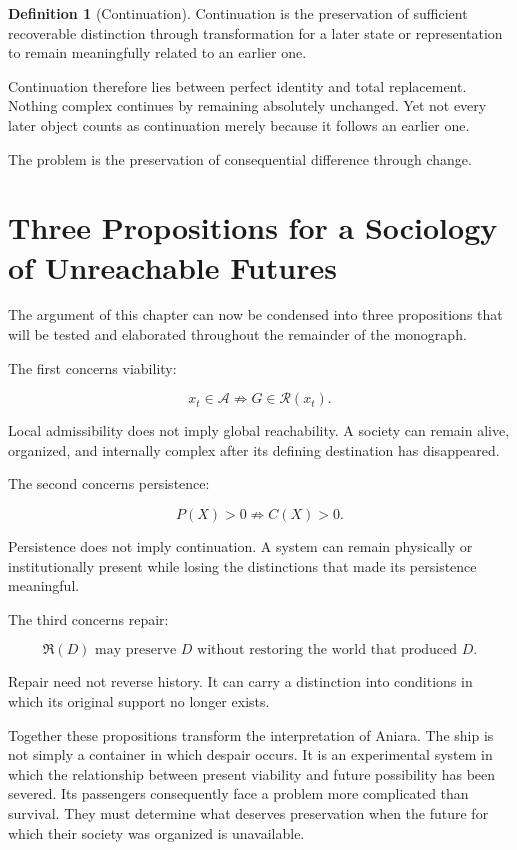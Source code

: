 \documentclass[11pt,oneside]{book}
\theoremstyle{definition}
\newtheorem{definition}[theorem]{Definition}
\theoremstyle{remark}
\newcommand{\A}{\mathcal{A}}
\newcommand{\R}{\mathcal{R}}
\newcommand{\Repair}{\mathfrak{R}}
\begin{document}
\begin{definition}[Continuation]
Continuation is the preservation of sufficient recoverable distinction through transformation for a later state or representation to remain meaningfully related to an earlier one.
\end{definition}

Continuation therefore lies between perfect identity and total replacement. Nothing complex continues by remaining absolutely unchanged. Yet not every later object counts as continuation merely because it follows an earlier one.

The problem is the preservation of consequential difference through change.

\section{Three Propositions for a Sociology of Unreachable Futures}

The argument of this chapter can now be condensed into three propositions that will be tested and elaborated throughout the remainder of the monograph.

The first concerns viability:

\[
\boxed{
x_t\in\A
\not\Rightarrow
G\in\R(x_t).
}
\]

Local admissibility does not imply global reachability. A society can remain alive, organized, and internally complex after its defining destination has disappeared.

The second concerns persistence:

\[
\boxed{
P(X)>0
\not\Rightarrow
C(X)>0.
}
\]

Persistence does not imply continuation. A system can remain physically or institutionally present while losing the distinctions that made its persistence meaningful.

The third concerns repair:

\[
\boxed{
\Repair(D)
\text{ may preserve }D
\text{ without restoring the world that produced }D.
}
\]

Repair need not reverse history. It can carry a distinction into conditions in which its original support no longer exists.

Together these propositions transform the interpretation of Aniara. The ship is not simply a container in which despair occurs. It is an experimental system in which the relationship between present viability and future possibility has been severed. Its passengers consequently face a problem more complicated than survival. They must determine what deserves preservation when the future for which their society was organized is unavailable.
\end{document}
